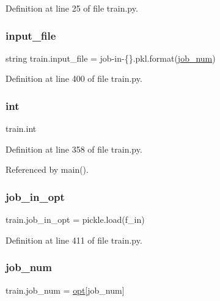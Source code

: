 Definition at line 25 of file train.\+py.

\mbox{\label{namespacetrain_a647c4fb1786c78fdc94676ae8e99581d}} 
\subsubsection{\texorpdfstring{input\+\_\+file}{input\_file}}
{\footnotesize\ttfamily string train.\+input\+\_\+file = \textquotesingle{}job-\/in-\/\{\}.pkl\textquotesingle{}.format(\hyperlink{namespacetrain_aa21180e9a522633e69afac0c0e608b85}{job\+\_\+num})}



Definition at line 400 of file train.\+py.

\mbox{\label{namespacetrain_af5de906790efe7cea370f1a69e020d52}} 
\subsubsection{\texorpdfstring{int}{int}}
{\footnotesize\ttfamily train.\+int}



Definition at line 358 of file train.\+py.



Referenced by main().

\mbox{\label{namespacetrain_a09cea1b757e4ebbba308040736f37c4f}} 
\subsubsection{\texorpdfstring{job\+\_\+in\+\_\+opt}{job\_in\_opt}}
{\footnotesize\ttfamily train.\+job\+\_\+in\+\_\+opt = pickle.\+load(f\+\_\+in)}



Definition at line 411 of file train.\+py.

\mbox{\label{namespacetrain_aa21180e9a522633e69afac0c0e608b85}} 
\subsubsection{\texorpdfstring{job\+\_\+num}{job\_num}}
{\footnotesize\ttfamily train.\+job\+\_\+num = \hyperlink{namespacetrain_a8ce47f3ce85e34ed945573b80e08aaf6}{opt}\mbox{[}\textquotesingle{}job\+\_\+num\textquotesingle{}\mbox{]}}



